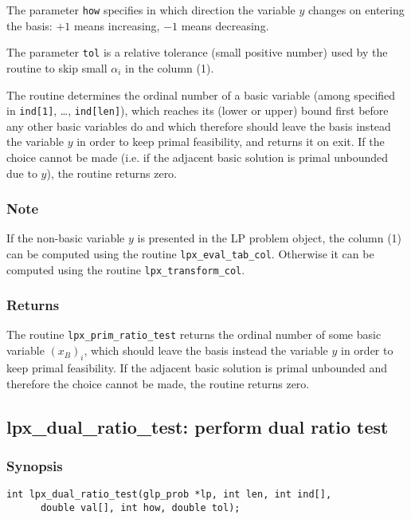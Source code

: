 The parameter \verb|how| specifies in which direction the variable $y$
changes on entering the basis: $+1$ means increasing, $-1$ means
decreasing.

The parameter \verb|tol| is a relative tolerance (small positive number)
used by the routine to skip small $\alpha_i$ in the column (1).

The routine determines the ordinal number of a basic variable
(among specified in \verb|ind[1]|, \dots, \verb|ind[len]|), which
reaches its (lower or upper) bound first before any other basic
variables do and which therefore should leave the basis instead the
variable $y$ in order to keep primal feasibility, and returns it on
exit. If the choice cannot be made (i.e. if the adjacent basic solution
is primal unbounded due to $y$), the routine returns zero.

\subsubsection*{Note}

If the non-basic variable $y$ is presented in the LP problem object, the
column (1) can be computed using the routine \verb|lpx_eval_tab_col|.
Otherwise it can be computed using the routine \verb|lpx_transform_col|.

\subsubsection*{Returns}

The routine \verb|lpx_prim_ratio_test| returns the ordinal number of
some basic variable $(x_B)_i$, which should leave the basis instead the
variable $y$ in order to keep primal feasibility. If the adjacent basic
solution is primal unbounded and therefore the choice cannot be made,
the routine returns zero.

\subsection{lpx\_dual\_ratio\_test: perform dual ratio test}

\subsubsection*{Synopsis}

\begin{verbatim}
int lpx_dual_ratio_test(glp_prob *lp, int len, int ind[],
      double val[], int how, double tol);
\end{verbatim}

